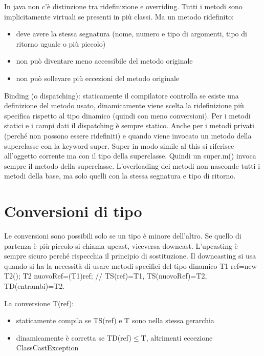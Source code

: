 In java non c'è distinzione tra ridefinizione e overriding. Tutti i metodi sono implicitamente virtuali se presenti in più classi. Ma un metodo ridefinito:
\begin{itemize}
\item deve avere la stessa segnatura (nome, numero e tipo di argomenti, tipo di ritorno uguale o più piccolo)
\item non può diventare meno accessibile del metodo originale
\item non può sollevare più eccezioni del metodo originale
\end{itemize}
Binding (o dispatching): staticamente il compilatore controlla se esiste una definizione del metodo usato, dinamicamente viene scelta la ridefinizione più specifica rispetto al tipo dinamico (quindi con meno conversioni).
Per i metodi statici e i campi dati il dispatching è sempre statico. Anche per i metodi privati (perché non possono essere ridefiniti) e quando viene invocato un metodo della superclasse con la keyword super. Super in modo simile al this si riferisce all'oggetto corrente ma con il tipo della superclasse. Quindi un super.m() invoca sempre il metodo della superclasse.
L'overloading dei metodi non nasconde tutti i metodi della base, ma solo quelli con la stessa segnatura e tipo di ritorno.

\section{Conversioni di tipo}
Le conversioni sono possibili solo se un tipo è minore dell'altro. Se quello di partenza è più piccolo si chiama upcast, viceversa downcast.
L'upcasting è sempre sicuro perché rispecchia il principio di sostituzione.
Il downcasting si usa quando si ha la necessità di usare metodi specifici del tipo dinamico %
T1 ref=new T2();
T2 nuovoRef=(T1)ref;
// TS(ref)=T1, TS(nuovoRef)=T2, TD(entrambi)=T2.

La conversione T(ref):
\begin{itemize}
\item  staticamente compila se TS(ref) e T sono nella stessa gerarchia
\item  dinamicamente è corretta se TD(ref)$\le$T, altrimenti eccezione ClassCastException
\end{itemize}

